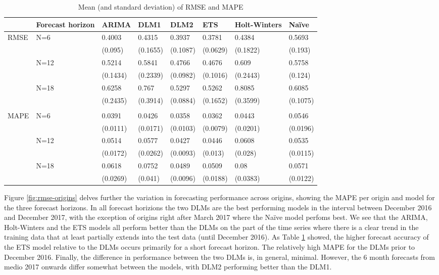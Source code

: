 \documentclass[]{article}
\begin{document}
\begin{table}[t]

\caption{\label{tab:error-comparison}Mean (and standard deviation) of RMSE and MAPE}
\centering
\begin{tabular}{llllllll}
\toprule
 & Forecast horizon & ARIMA & DLM1 & DLM2 & ETS & Holt-Winters & Naïve\\
\midrule
RMSE & N=6 & 0.4003 & 0.4315 & 0.3937 & 0.3781 & 0.4384 & 0.5693\\
 &  & (0.095) & (0.1655) & (0.1087) & (0.0629) & (0.1822) & (0.193)\\
 & N=12 & 0.5214 & 0.5841 & 0.4766 & 0.4676 & 0.609 & 0.5758\\
 &  & (0.1434) & (0.2339) & (0.0982) & (0.1016) & (0.2443) & (0.124)\\
 & N=18 & 0.6258 & 0.767 & 0.5297 & 0.5262 & 0.8085 & 0.6085\\
\addlinespace
 &  & (0.2435) & (0.3914) & (0.0884) & (0.1652) & (0.3599) & (0.1075)\\
 &  &  &  &  &  &  & \\
MAPE & N=6 & 0.0391 & 0.0426 & 0.0358 & 0.0362 & 0.0443 & 0.0546\\
 &  & (0.0111) & (0.0171) & (0.0103) & (0.0079) & (0.0201) & (0.0196)\\
 & N=12 & 0.0514 & 0.0577 & 0.0427 & 0.0446 & 0.0608 & 0.0535\\
\addlinespace
 &  & (0.0172) & (0.0262) & (0.0093) & (0.013) & (0.028) & (0.0115)\\
 & N=18 & 0.0618 & 0.0752 & 0.0489 & 0.0509 & 0.08 & 0.0571\\
 &  & (0.0269) & (0.041) & (0.0096) & (0.0188) & (0.0383) & (0.0122)\\
\bottomrule
\end{tabular}
\end{table}

Figure \ref{fig:rmse-origins} delves further the variation in
forecasting performance across origins, showing the MAPE per origin and
model for the three forecast horizons. In all forecast horizions the two
DLMs are the best performing models in the interval between December
2016 and December 2017, with the exception of origins right after March
2017 where the Naïve model perfoms best. We see that the ARIMA,
Holt-Winters and the ETS models all perform better than the DLMs on the
part of the time series where there is a clear trend in the training
data that at least partially extends into the test data (until December
2016). As Table \ref{tab:error-comparison} showed, the higher forecast
accuracy of the ETS model relative to the DLMs occurs primarily for a
short forecast horizon. The relatively high MAPE for the DLMs prior to
December 2016. Finally, the difference in performance between the two
DLMs is, in general, minimal. However, the 6 month forecasts from medio
2017 onwards differ somewhat between the models, with DLM2 performing
better than the DLM1.
\end{document}
